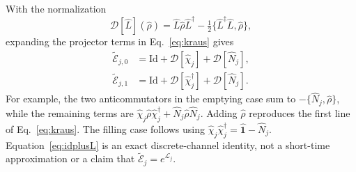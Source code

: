 \documentclass[aps,prb,onecolumn,nofootinbib,superscriptaddress,floatfix]{revtex4-2}
\newcommand{\Id}{\hat{\mathbf 1}}
\newcommand{\E}{\widetilde{\mathcal E}}
\newcommand{\D}{\mathcal D}
\begin{document}
With the normalization
\begin{equation}
 \D[\hat L](\hat\rho)=\hat L\hat\rho\hat L^\dagger
 -\tfrac12\{\hat L^\dagger\hat L,\hat\rho\},
 \label{eq:dissipator}
\end{equation}
expanding the projector terms in Eq.~\eqref{eq:kraus} gives
\begin{align}
 \E_{j,0}&=\mathrm{Id}+\D[\hat\chi_j]+\D[\hat N_j],\nonumber\\
 \E_{j,1}&=\mathrm{Id}+\D[\hat\chi_j^\dagger]+\D[\hat N_j].
 \label{eq:idplusL}
\end{align}
For example, the two anticommutators in the emptying case sum to
$-\{\hat N_j,\hat\rho\}$, while the remaining terms are
$\hat\chi_j\hat\rho\hat\chi_j^\dagger+\hat N_j\hat\rho\hat N_j$.
Adding $\hat\rho$ reproduces the first line of Eq.~\eqref{eq:kraus}.
The filling case follows using $\hat\chi_j\hat\chi_j^\dagger=\Id-\hat N_j$.
Equation~\eqref{eq:idplusL} is an exact discrete-channel identity,
not a short-time approximation or a claim that $\E_j=e^{\mathcal L_j}$.
\end{document}
